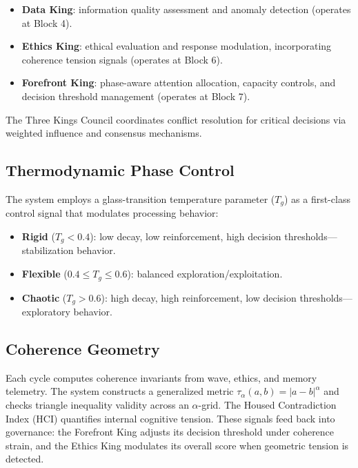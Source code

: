\documentclass[11pt,a4paper]{article}
\begin{document}
\begin{itemize}[nosep]
    \item \textbf{Data King}: information quality assessment and anomaly 
          detection (operates at Block 4).
    \item \textbf{Ethics King}: ethical evaluation and response modulation, 
          incorporating coherence tension signals (operates at Block 6).
    \item \textbf{Forefront King}: phase-aware attention allocation, capacity 
          controls, and decision threshold management (operates at Block 7).
\end{itemize}

\noindent The Three Kings Council coordinates conflict resolution for critical 
decisions via weighted influence and consensus mechanisms.

\subsection{Thermodynamic Phase Control}

The system employs a glass-transition temperature parameter ($T_g$) as a 
first-class control signal that modulates processing behavior:

\begin{itemize}[nosep]
    \item \textbf{Rigid} ($T_g < 0.4$): low decay, low reinforcement, high 
          decision thresholds---stabilization behavior.
    \item \textbf{Flexible} ($0.4 \leq T_g \leq 0.6$): balanced 
          exploration/exploitation.
    \item \textbf{Chaotic} ($T_g > 0.6$): high decay, high reinforcement, 
          low decision thresholds---exploratory behavior.
\end{itemize}

\subsection{Coherence Geometry}

Each cycle computes coherence invariants from wave, ethics, and memory 
telemetry. The system constructs a generalized metric 
$\tau_\alpha(a,b) = |a - b|^\alpha$ and checks triangle inequality validity 
across an $\alpha$-grid. The Housed Contradiction Index (HCI) quantifies 
internal cognitive tension. These signals feed back into governance: the 
Forefront King adjusts its decision threshold under coherence strain, and 
the Ethics King modulates its overall score when geometric tension is 
detected.
\end{document}

